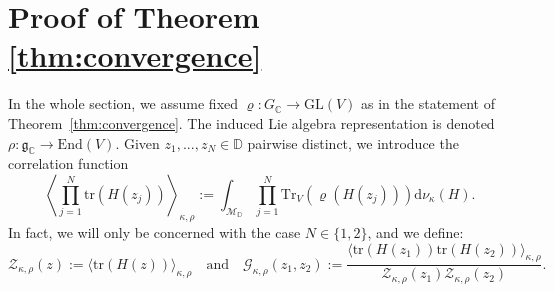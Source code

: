 \documentclass[12pt,a4paper]{amsart}
\numberwithin{equation}{section}
\theoremstyle{remark}
\theoremstyle{definition}
\newcommand{\kg}{\mathfrak g}
\newcommand{\C}{\mathbb C}
\renewcommand{\S}{\mathbb S}
\newcommand{\D}{\mathbb D}
\renewcommand{\d}{\mathrm d}
\newcommand{\cM}{\mathcal M}
\newcommand{\cH}{\mathcal{H}}
\newcommand{\tr}{\mathrm{tr}}
\newcommand{\cG}{\mathcal{G}}
\newcommand{\qand}{\quad\text{and}\quad}
\newcommand{\cZ}{\mathcal{Z}}
\begin{document}

\section{Proof of Theorem \ref{thm:convergence}}\label{sec:proof}



In the whole section, we assume fixed $\varrho:G_\C\to\mathrm{GL}(V)$ as in the statement of Theorem~\ref{thm:convergence}. The induced Lie algebra representation is denoted $\rho:\kg_\C\to\mathrm{End}(V)$. Given $z_1,...,z_N\in\D$ pairwise distinct, we introduce the correlation function
\[\left\langle\prod_{j=1}^N\tr(H(z_j))\right\rangle_{\kappa,\rho}:=\int_{\cM_\D}\prod_{j=1}^N\mathrm{Tr}_V\left(\varrho(H(z_j))\right)\d\nu_\kappa(H).\]
In fact, we will only be concerned with the case $N\in\{1,2\}$, and we define:
\begin{equation}\label{eq:def-correls}
\cZ_{\kappa,\rho}(z):=\langle\tr(H(z))\rangle_{\kappa,\rho}\qand\cG_{\kappa,\rho}(z_1,z_2):=\frac{\langle\tr(H(z_1))\tr(H(z_2))\rangle_{\kappa,\rho}}{\cZ_{\kappa,\rho}(z_1)\cZ_{\kappa,\rho}(z_2)}.
\end{equation}
\end{document}
